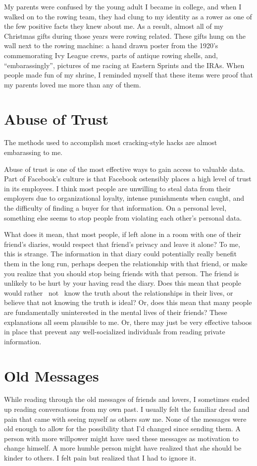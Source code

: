 \documentclass[12pt]{article}
\begin{document}
My parents were confused by the young adult I became in college, and when I
walked on to the rowing team, they had clung to my identity as a rower as one of
the few positive facts they knew about me.  As a result, almost all of my
Christmas gifts during those years were rowing related.  These gifts hung on the
wall next to the rowing machine: a hand drawn poster from the 1920's
commemorating Ivy League crews, parts of antique rowing shells, and,
``embarassingly'', pictures of me racing at Eastern Sprints and the IRAs.  When
people made fun of my shrine, I reminded myself that these items were proof that
my parents loved me more than any of them.


\section{Abuse of Trust}
The methods used to accomplish most cracking-style hacks are almost embarassing
to me. 

Abuse of trust is one of the most effective ways to gain access to valuable
data.  Part of Facebook's culture is that Facebook ostensibly places a high
level of trust in its employees.  I think most people are unwilling to steal
data from their employers due to organizational loyalty, intense punishments
when caught, and the difficulty of finding a buyer for that information.  On a
personal level, something else seems to stop people from violating each other's
personal data.

What does it mean, that most people, if left alone in a room with one of their
friend's diaries, would respect that friend's privacy and leave it alone?  To
me, this is strange.  The information in that diary could potentially really
benefit them in the long run, perhaps deepen the relationship with that friend,
or make you realize that you should stop being friends with that person.  The
friend is unlikely to be hurt by your having read the diary.  Does this mean
that people would rather ~not~ know the truth about the relationships in their
lives, or believe that not knowing the truth is ideal?  Or, does this mean that
many people are fundamentally uninterested in the mental lives of their friends?
These explanations all seem plausible to me.  Or, there may just be very
effective taboos in place that prevent any well-socialized individuals from
reading private information.

\section{Old Messages}
While reading through the old messages of friends and lovers, I sometimes ended
up reading conversations from my own past.  I usually felt the familiar dread
and pain that came  with seeing myself as others saw me.  None of the messages
were old enough to allow for the possibility that I'd changed since sending
them.  A person with more willpower might have used these messages as motivation
to change himself.  A more humble person might have realized that she should be
kinder to others.  I felt pain but realized that I had to ignore it.
\end{document}
